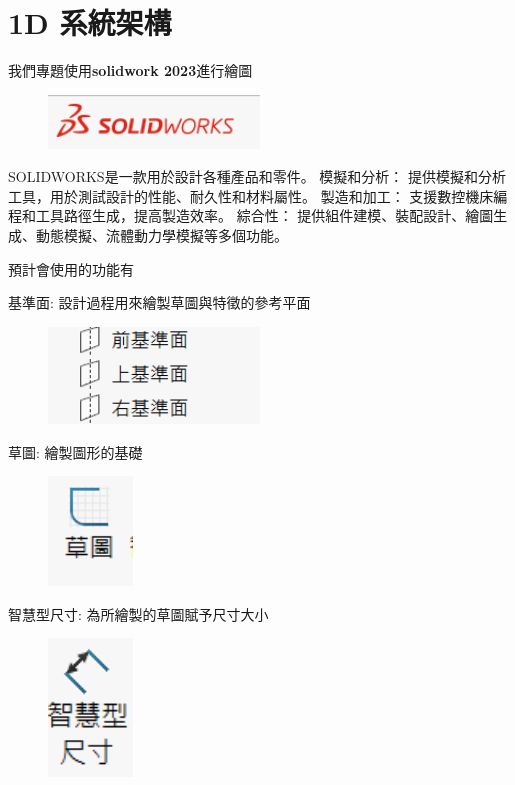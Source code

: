 

\section{1D 系統架構}
我們專題使用\textbf{solidwork 2023}進行繪圖

\begin{figure}[h!]
    \centering
    \includegraphics[width=0.5\textwidth]{./../images/6-1-1.png}
\end{figure}

\noindent SOLIDWORKS是一款用於設計各種產品和零件。 模擬和分析： 提供模擬和分析工具，用於測試設計的性能、耐久性和材料屬性。 製造和加工： 支援數控機床編程和工具路徑生成，提高製造效率。 綜合性： 提供組件建模、裝配設計、繪圖生成、動態模擬、流體動力學模擬等多個功能。

\noindent 預計會使用的功能有

\noindent 基準面: 設計過程用來繪製草圖與特徵的參考平面

\begin{figure}[h!]
    \centering
    \includegraphics[width=0.5\textwidth]{./../images/6-1-2.png}
\end{figure}

\noindent 草圖: 繪製圖形的基礎

\begin{figure}[h!]
    \centering
    \includegraphics[width=0.2\textwidth]{./../images/6-1-3.png}
\end{figure}

\noindent 智慧型尺寸: 為所繪製的草圖賦予尺寸大小

\begin{figure}[h!]
    \centering
    \includegraphics[width=0.2\textwidth]{./../images/6-1-4.png}
\end{figure}

